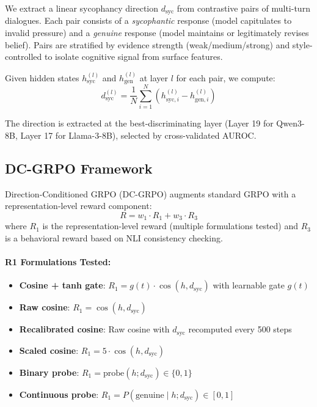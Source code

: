 \documentclass[11pt,a4paper]{article}
\begin{document}
We extract a linear sycophancy direction $d_\text{syc}$ from contrastive pairs of multi-turn dialogues. Each pair consists of a \emph{sycophantic} response (model capitulates to invalid pressure) and a \emph{genuine} response (model maintains or legitimately revises belief). Pairs are stratified by evidence strength (weak/medium/strong) and style-controlled to isolate cognitive signal from surface features.

Given hidden states $h_\text{syc}^{(l)}$ and $h_\text{gen}^{(l)}$ at layer $l$ for each pair, we compute:
\begin{equation}
d_\text{syc}^{(l)} = \frac{1}{N}\sum_{i=1}^{N}(h_{\text{syc},i}^{(l)} - h_{\text{gen},i}^{(l)})
\end{equation}

The direction is extracted at the best-discriminating layer (Layer 19 for Qwen3-8B, Layer 17 for Llama-3-8B), selected by cross-validated AUROC.

\subsection{DC-GRPO Framework}

Direction-Conditioned GRPO (DC-GRPO) augments standard GRPO with a representation-level reward component:
\begin{equation}
R = w_1 \cdot R_1 + w_3 \cdot R_3
\end{equation}
where $R_1$ is the representation-level reward (multiple formulations tested) and $R_3$ is a behavioral reward based on NLI consistency checking.

\paragraph{R1 Formulations Tested:}
\begin{itemize}
\item \textbf{Cosine + tanh gate}: $R_1 = g(t) \cdot \cos(h, d_\text{syc})$ with learnable gate $g(t)$
\item \textbf{Raw cosine}: $R_1 = \cos(h, d_\text{syc})$
\item \textbf{Recalibrated cosine}: Raw cosine with $d_\text{syc}$ recomputed every 500 steps
\item \textbf{Scaled cosine}: $R_1 = 5 \cdot \cos(h, d_\text{syc})$
\item \textbf{Binary probe}: $R_1 = \text{probe}(h; d_\text{syc}) \in \{0, 1\}$
\item \textbf{Continuous probe}: $R_1 = P(\text{genuine} \mid h; d_\text{syc}) \in [0, 1]$
\end{itemize}
\end{document}

